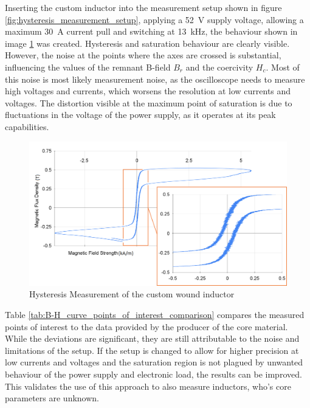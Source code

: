 Inserting the custom inductor into the measurement setup shown in figure \ref{fig:hysteresis_measurement_setup}, applying a \SI{52}{\V} supply voltage, allowing a maximum \SI{30}{\A} current pull and switching at \SI{13}{\kilo\Hz}, the behaviour shown in image \ref{fig:hysteresis_measurement_of_the_custom_wound_inductor} was created. 
Hysteresis and saturation behaviour are clearly visible. However, the noise at the points where the axes are crossed is substantial, influencing the values of the remnant B-field $B_r$ and the coercivity $H_c$. Most of this noise is most likely measurement noise, as the oscilloscope needs to measure high voltages and currents, which worsens the resolution at low currents and voltages. The distortion visible at the maximum point of saturation is due to fluctuations in the voltage of the power supply, as it operates at its peak capabilities.
\begin{figure}[H]
    \centering
    \includegraphics[width=1\linewidth]{Bilder//Kapitel3/Hysteresis_Measurement_3.png}
    \caption{Hysteresis Measurement of the custom wound inductor}
    \label{fig:hysteresis_measurement_of_the_custom_wound_inductor}
\end{figure}
Table \ref{tab:B-H_curve_points_of_interest_comparison} compares the measured points of interest to the data provided by the producer of the core material. While the deviations are significant, they are still attributable to the noise and limitations of the setup. If the setup is changed to allow for higher precision at low currents and voltages and the saturation region is not plagued by unwanted behaviour of the power supply and electronic load, the results can be improved. This validates the use of this approach to also measure inductors, who's core parameters are unknown. 
